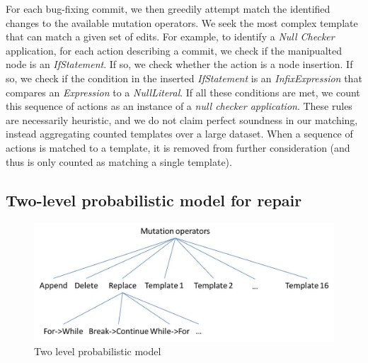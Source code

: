 \documentclass[conference]{IEEEtran}
\begin{document}
For each bug-fixing commit, we then greedily attempt match the identified changes to the
available 
mutation operators. We seek the most complex template that can match a given set
of edits.  For example, to identify
a \emph{Null Checker} application, for each action describing a commit, we check
if the manipualted node
is an \emph{IfStatement}.  If so, we check whether the action
is a node insertion.  If so, we check if the condition in the inserted
\emph{IfStatement} is an 
\emph{InfixExpression} that compares an 
\emph{Expression} to a
\emph{NullLiteral}. If all these conditions are met, we count this sequence of
actions as an instance of a \emph{null checker application}.  These rules are
necessarily heuristic, and we do not claim perfect soundness in our matching,
instead aggregating counted templates over a large dataset.  When a sequence of
actions is matched to a template, it is removed from further consideration (and
thus is only counted as matching a single template).  






\subsection{Two-level probabilistic model for repair}

\begin{figure}[!h]
  \centering
    \includegraphics[scale=0.4]{Picture2}
  \caption{Two level probabilistic model}
  \label{fig:probModel}
\end{figure}
\end{document}
